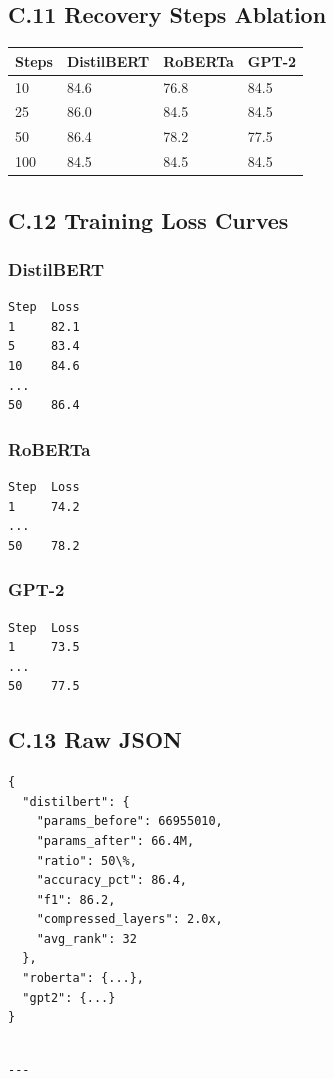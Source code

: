 \subsection{C.11 Recovery Steps Ablation}

\begin{table}[H]
\centering
\small
\begin{tabular}{llll}
\toprule
\textbf{Steps} & \textbf{DistilBERT} & \textbf{RoBERTa} & \textbf{GPT-2} \\
\midrule
10 & 84.6 & 76.8 & 84.5 \\
25 & 86.0 & 84.5 & 84.5 \\
50 & 86.4 & 78.2 & 77.5 \\
100 & 84.5 & 84.5 & 84.5 \\
\bottomrule
\end{tabular}
\end{table}

\subsection{C.12 Training Loss Curves}

\subsubsection{DistilBERT}
\begin{lstlisting}
Step  Loss
1     82.1
5     83.4
10    84.6
...
50    86.4
\end{lstlisting}

\subsubsection{RoBERTa}
\begin{lstlisting}
Step  Loss
1     74.2
...
50    78.2
\end{lstlisting}

\subsubsection{GPT-2}
\begin{lstlisting}
Step  Loss
1     73.5
...
50    77.5
\end{lstlisting}

\subsection{C.13 Raw JSON}

\begin{lstlisting}
{
  "distilbert": {
    "params_before": 66955010,
    "params_after": 66.4M,
    "ratio": 50\%,
    "accuracy_pct": 86.4,
    "f1": 86.2,
    "compressed_layers": 2.0x,
    "avg_rank": 32
  },
  "roberta": {...},
  "gpt2": {...}
}
\end{lstlisting}
\begin{lstlisting}

---
\end{lstlisting}


